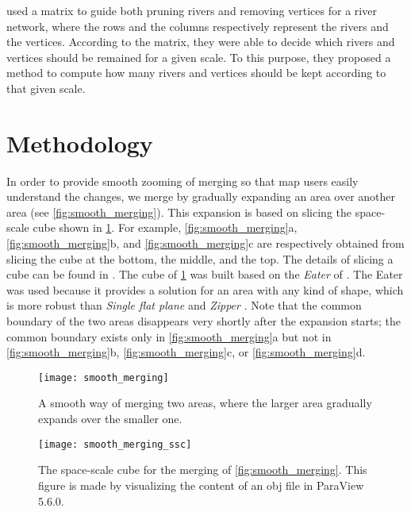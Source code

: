 \documentclass[ijgi,article,submit,moreauthors,pdftex]{Definitions/mdpi}
\begin{document}
\citet{Huang2017Matrix} used a matrix to guide 
both pruning rivers and removing vertices for a river network, 
where the rows and the columns respectively represent
the rivers and the vertices.
According to the matrix, 
they were able to decide which rivers and vertices 
should be remained for a given scale.
To this purpose, they proposed a method 
to compute how many rivers and vertices 
should be kept according to that given scale.







%

\section{Methodology}
\label{sec:methodology}



In order to provide smooth zooming of merging
so that map users easily understand the changes,
we merge by gradually expanding an area over another area
(see \fig\ref{fig:smooth_merging}).
This expansion is based on slicing the space-scale cube shown in
\fig\ref{fig:smooth_merging_ssc}.
For example, \figs\ref{fig:smooth_merging}a,
\ref{fig:smooth_merging}b, and \ref{fig:smooth_merging}c
are respectively obtained from slicing the cube 
at the bottom, the middle, and the top.
The details of slicing a cube can be found in \citet{Meijers2020Web}.
The cube of \fig\ref{fig:smooth_merging_ssc} was built 
based on the \emph{Eater} of \citet{Suba2014Merge}.
The Eater was used because it provides a solution 
for an area with any kind of shape, which is more robust than
\emph{Single flat plane} and \emph{Zipper} \citep{Suba2014Merge}.
Note that the common boundary of the two areas disappears
very shortly after the expansion starts;
the common boundary exists only in \fig\ref{fig:smooth_merging}a but not in
\fig\ref{fig:smooth_merging}b,
\fig\ref{fig:smooth_merging}c, or
\fig\ref{fig:smooth_merging}d.


\begin{figure}[tb]
\centering
\texttt{[image: smooth\_merging]}
\caption{A smooth way of merging two areas,
    where the larger area gradually expands over the smaller one.}
\label{fig:smooth_merging}
%
\vspace{6mm}
%
\centering
\texttt{[image: smooth\_merging\_ssc]}
\caption{The space-scale cube for the merging 
    of \fig\ref{fig:smooth_merging}.
    This figure is made by visualizing the content of an obj file in 
    ParaView 5.6.0.}
\label{fig:smooth_merging_ssc}
\end{figure}
\end{document}
